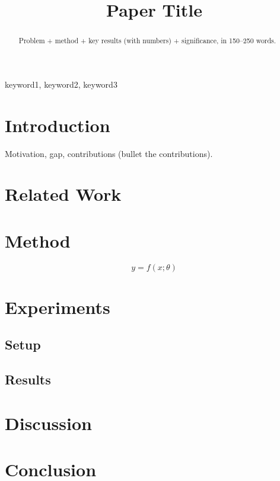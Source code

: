 \documentclass[conference]{IEEEtran}   %
\begin{document}
\title{Paper Title}
\author{
}

\maketitle

\begin{abstract}
Problem + method + key results (with numbers) + significance, in 150--250 words.
\end{abstract}

\begin{IEEEkeywords}
keyword1, keyword2, keyword3
\end{IEEEkeywords}

\section{Introduction}
Motivation, gap, contributions (bullet the contributions).

\section{Related Work}

\section{Method}
\begin{equation} y = f(x;\theta) \end{equation}

\section{Experiments}
\subsection{Setup}
\subsection{Results}

\section{Discussion}

\section{Conclusion}



\end{document}

